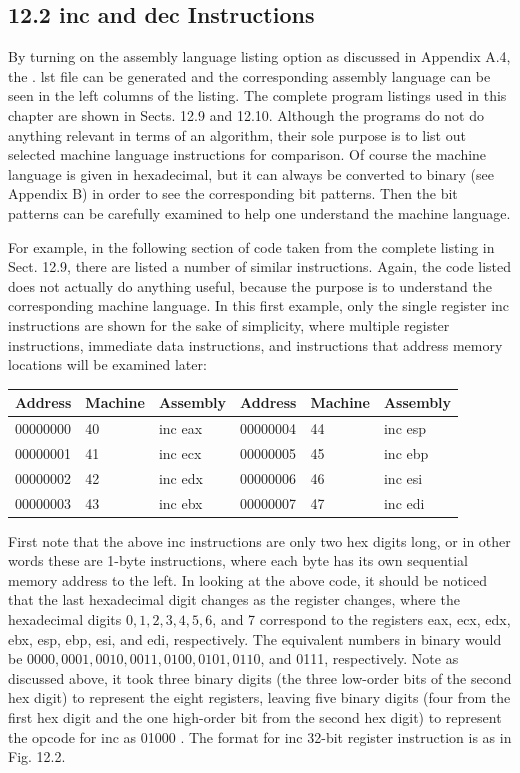 \documentclass[10pt]{book}
\begin{document}
\begin{center}
\begin{center}
\begin{center}
\begin{center}
\section*{12.2 inc and dec Instructions}
By turning on the assembly language listing option as discussed in Appendix A.4, the . lst file can be generated and the corresponding assembly language can be seen in the left columns of the listing. The complete program listings used in this chapter are shown in Sects. 12.9 and 12.10. Although the programs do not do anything relevant in terms of an algorithm, their sole purpose is to list out selected machine language instructions for comparison. Of course the machine language is given in hexadecimal, but it can always be converted to binary (see Appendix B) in order to see the corresponding bit patterns. Then the bit patterns can be carefully examined to help one understand the machine language.

For example, in the following section of code taken from the complete listing in Sect. 12.9, there are listed a number of similar instructions. Again, the code listed does not actually do anything useful, because the purpose is to understand the corresponding machine language. In this first example, only the single register inc instructions are shown for the sake of simplicity, where multiple register instructions, immediate data instructions, and instructions that address memory locations will be examined later:

\begin{center}
\begin{tabular}{|l|l|l|l|l|l|}
\hline
Address & Machine & Assembly & Address & Machine & Assembly \\
\hline
00000000 & 40 & inc eax & 00000004 & 44 & inc esp \\
\hline
00000001 & 41 & inc ecx & 00000005 & 45 & inc ebp \\
\hline
00000002 & 42 & inc edx & 00000006 & 46 & inc esi \\
\hline
00000003 & 43 & inc ebx & 00000007 & 47 & inc edi \\
\hline
\end{tabular}
\end{center}

First note that the above inc instructions are only two hex digits long, or in other words these are 1-byte instructions, where each byte has its own sequential memory address to the left. In looking at the above code, it should be noticed that the last hexadecimal digit changes as the register changes, where the hexadecimal digits $0,1,2,3,4,5,6$, and 7 correspond to the registers eax, ecx, edx, ebx, esp, ebp, esi, and edi, respectively. The equivalent numbers in binary would be $0000,0001,0010,0011,0100,0101,0110$, and 0111, respectively. Note as discussed above, it took three binary digits (the three low-order bits of the second hex digit) to represent the eight registers, leaving five binary digits (four from the first hex digit and the one high-order bit from the second hex digit) to represent the opcode for inc as 01000 . The format for inc 32-bit register instruction is as in Fig. 12.2.


\end{center}
\end{center}
\end{center}
\end{center}
\end{document}
